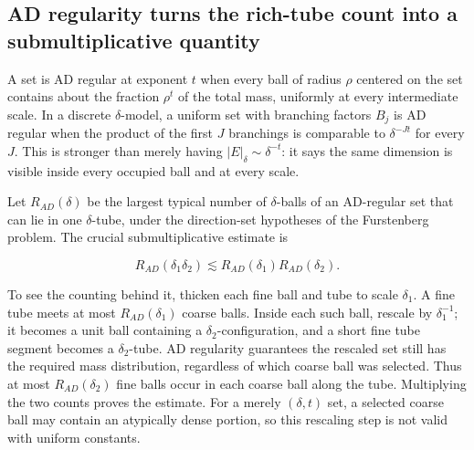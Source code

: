 \subsection{AD regularity turns the rich-tube count into a submultiplicative quantity}\label{04-visual-computing-ii-ch033-ad-regularity-turns-the-rich-tube-count-into-a-submultiplicative-quantity-1}

A set is AD regular at exponent \(t\) when every ball of radius \(\rho\) centered on the set contains about the fraction \(\rho^t\) of the total mass, uniformly at every intermediate scale. In a discrete \(\delta\)-model, a uniform set with branching factors \(B_j\) is AD regular when the product of the first \(J\) branchings is comparable to \(\delta^{-Jt}\) for every \(J\). This is stronger than merely having \(|E|_\delta\sim\delta^{-t}\): it says the same dimension is visible inside every occupied ball and at every scale.

Let \(R_{AD}(\delta)\) be the largest typical number of \(\delta\)-balls of an AD-regular set that can lie in one \(\delta\)-tube, under the direction-set hypotheses of the Furstenberg problem. The crucial submultiplicative estimate is

\[R_{AD}(\delta_1\delta_2)\lesssim R_{AD}(\delta_1)R_{AD}(\delta_2).\]

To see the counting behind it, thicken each fine ball and tube to scale \(\delta_1\). A fine tube meets at most \(R_{AD}(\delta_1)\) coarse balls. Inside each such ball, rescale by \(\delta_1^{-1}\); it becomes a unit ball containing a \(\delta_2\)-configuration, and a short fine tube segment becomes a \(\delta_2\)-tube. AD regularity guarantees the rescaled set still has the required mass distribution, regardless of which coarse ball was selected. Thus at most \(R_{AD}(\delta_2)\) fine balls occur in each coarse ball along the tube. Multiplying the two counts proves the estimate. For a merely \((\delta,t)\) set, a selected coarse ball may contain an atypically dense portion, so this rescaling step is not valid with uniform constants.

